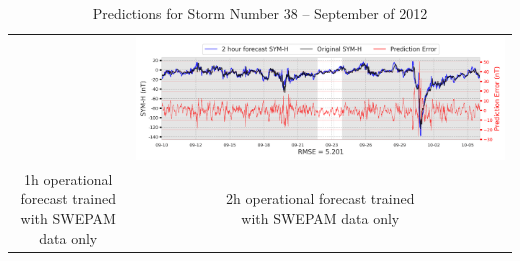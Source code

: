 \documentclass[draft,sw]{agutexSI2019}
\begin{document}
\begin{table}
\begin{tabular}{cc}
&
\includegraphics[width=0.49\linewidth]{paper_plots_shade/2h_swepam_rt/2h_swepam_rt_storm_38.png}
\\
\shortstack{1h operational forecast trained\\ with SWEPAM data only} & \shortstack{2h operational forecast trained\\ with SWEPAM data only}
\vspace*{12pt}
\\
\end{tabular}
\caption{Predictions for Storm Number 38 -- September of 2012}
\label{storm-38}
\end{table}
\end{document}
